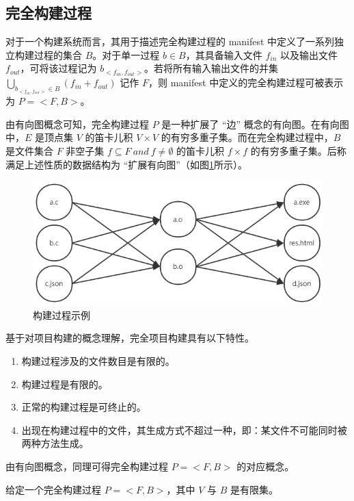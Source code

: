 \subsection{完全构建过程}

对于一个构建系统而言，其用于描述完全构建过程的 manifest 中定义了一系列独立构建过程的集合 $B$。对于单一过程 $b \in B$，其具备输入文件 $f_{in}$ 以及输出文件 $f_{out}$，可将该过程记为 $b_{<f_{in}, f_{out}>}$。若将所有输入输出文件的并集 $\bigcup_{b_{<f_{in}, f_{out}>} \in B} (f_{in} + f_{out})$ 记作 $F$，则 manifest 中定义的完全构建过程可被表示为 $P = <F, B>$。

由有向图概念可知，完全构建过程 $P$ 是一种扩展了 “边” 概念的有向图。在有向图中，$E$ 是顶点集 $V$ 的笛卡儿积 $V \times V$ 的有穷多重子集。而在完全构建过程中，$B$ 是文件集合 $F$ 非空子集 $f \subseteq F\ and\ f \neq \emptyset$ 的笛卡儿积 $f \times f$ 的有穷多重子集。后称满足上述性质的数据结构为 “扩展有向图”（如图\ref{fig:build-process}所示）。

\begin{figure}
    \centering
    \includegraphics[width=.7\textwidth]{figures/build-process.png}
    \caption{构建过程示例}
    \label{fig:build-process}
\end{figure}

基于对项目构建的概念理解，完全项目构建具有以下特性。

\begin{enumerate}
    \item 构建过程涉及的文件数目是有限的。
    \item 构建过程是有限的。
    \item 正常的构建过程是可终止的。
    \item 出现在构建过程中的文件，其生成方式不超过一种，即：某文件不可能同时被两种方法生成。
\end{enumerate}

由有向图概念，同理可得完全构建过程 $P = <F, B>$ 的对应概念。

\begin{lem}
    给定一个完全构建过程 $P = <F, B>$，其中 $V$ 与 $B$ 是有限集。
\end{lem}   

